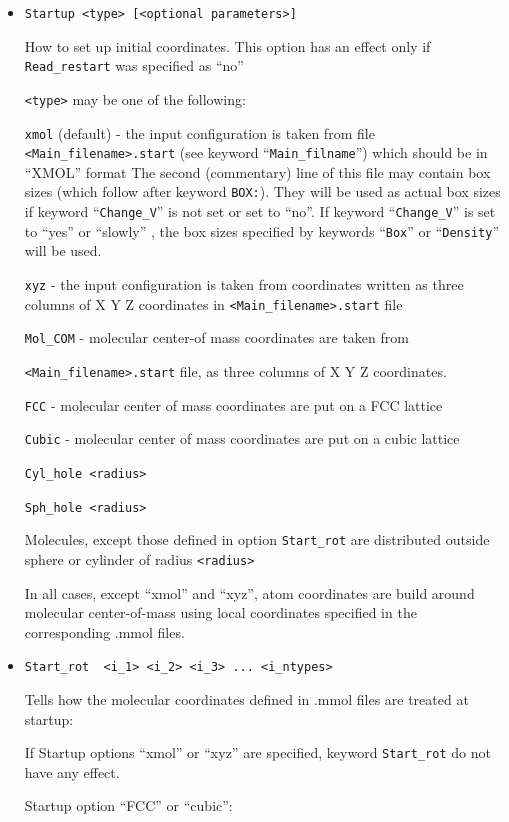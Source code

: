 \documentclass{article}
\begin{document}
\begin{itemize}
\item
\verb|Startup <type> [<optional parameters>]|

How to set up initial coordinates.
This option has an effect only if \verb|Read_restart| was specified as ``no'' 

\verb|<type>| may be one of the following:

\verb|xmol| (default) - the input configuration is taken from file 
\verb|<Main_filename>.start|
(see keyword ``\verb|Main_filname|'') which should be in ``XMOL'' format
The second (commentary) line of this file may contain box sizes (which 
follow after keyword \verb|BOX:|). They will be used as actual box sizes
if keyword ``\verb|Change_V|'' is not set or set to ``no''. If 
keyword ``\verb|Change_V|'' is set to ``yes'' or ``slowly'' , the box sizes
specified by keywords ``\verb|Box|'' or ``\verb|Density|'' will be used. 

\verb|xyz|   - the input configuration is taken from coordinates written as 
three columns of X Y Z coordinates in \verb|<Main_filename>.start| file

\verb|Mol_COM| - molecular center-of mass coordinates are taken from 

\verb|<Main_filename>.start| file, as three columns of X Y Z coordinates. 

\verb|FCC| - molecular center of mass coordinates are put on a FCC lattice  

\verb|Cubic| - molecular center of mass coordinates are put on a cubic 
lattice  

\verb|Cyl_hole <radius>|

\verb|Sph_hole <radius>|

Molecules, except those defined in option \verb|Start_rot| are distributed
outside sphere or cylinder of radius \verb|<radius>|

In all cases, except ``xmol'' and ``xyz'', atom coordinates are build
around molecular center-of-mass using local coordinates specified in the
corresponding .mmol files.

\item
\verb|Start_rot  <i_1> <i_2> <i_3> ... <i_ntypes>|

Tells how the molecular coordinates defined in .mmol files are treated 
at startup:

If Startup options ``xmol'' or ``xyz'' are specified, keyword
\verb|Start_rot| do not have any effect.

Startup option ``FCC'' or ``cubic'':


\end{itemize}
\end{document}
